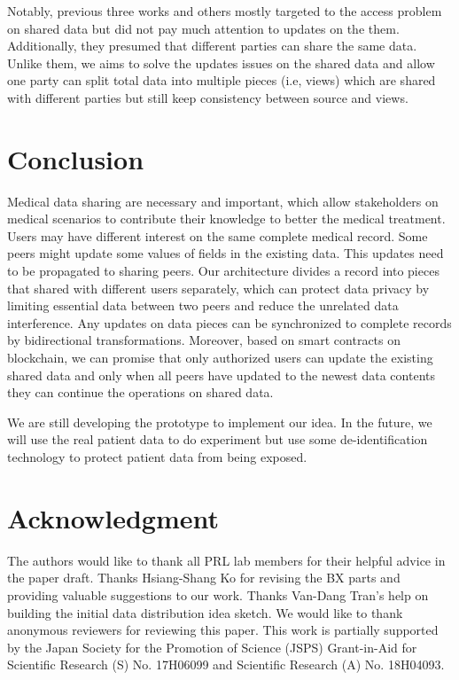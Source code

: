 \documentclass[conference]{IEEEtran}
\begin{document}
Notably, previous three works and others \cite{liu2018bpds,xia2017bbds,amofa2018blockchain,dagher2018ancile,fan2018medblock} mostly targeted to the access problem on shared data but did not pay much attention to updates on the them. Additionally, they presumed that different parties can share the same data. Unlike them, we aims to solve the updates issues on the shared data and allow one party can split total data into multiple pieces (i.e, views) which are shared with different parties but still keep consistency between source and views.

\section{Conclusion}
\label{conclude}

Medical data sharing are necessary and important, which allow stakeholders on medical scenarios to contribute their knowledge to better the medical treatment. Users may have different interest on the same complete medical record. Some peers might update some values of fields in the existing data. This updates need to be propagated to sharing peers. Our architecture divides a record into pieces that shared with different users separately, which can protect data privacy by limiting essential data between two peers and reduce the unrelated data interference. Any updates on data pieces can be synchronized to complete records by bidirectional transformations. Moreover, based on smart contracts on blockchain, we can promise that only authorized users can update the existing shared data and only when all peers have updated to the newest data contents they can continue the operations on shared data.   

We are still developing the prototype to implement our idea.
In the future, we will use the real patient data to do experiment but use some de-identification technology to protect patient data from being exposed. 

\section*{Acknowledgment}
The authors would like to thank all PRL lab members for their helpful advice in the paper draft.  Thanks Hsiang-Shang Ko for revising the BX parts and providing valuable suggestions to our work. Thanks Van-Dang Tran's help on building the initial data distribution idea sketch. We would like to thank anonymous reviewers for reviewing this paper. This work is partially supported by the Japan Society for the Promotion of Science (JSPS) Grant-in-Aid for Scientific Research (S) No. 17H06099 and Scientific Research (A) No. 18H04093.



\end{document}
